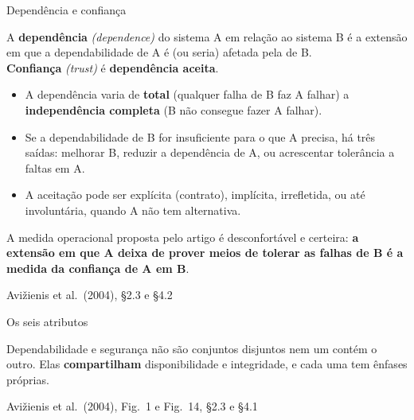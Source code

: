 \documentclass{beamer}
\newcommand{\en}[1]{{\color{depCinza}\textit{#1}}}
\newcommand{\sect}[1]{\par\smallskip\hfill{\tiny\color{black!55}Avi\v{z}ienis et al.\ (2004), #1}}
\begin{document}
\begin{frame}{Depend\^encia e confian\c{c}a}
    \footnotesize
    \begin{defi}
        \scriptsize
        A \textbf{depend\^encia} \en{(dependence)} do sistema A em rela\c{c}\~ao ao sistema B \'e a extens\~ao em que a dependabilidade de A \'e (ou seria) afetada pela de B.\\[3pt]
        \textbf{Confian\c{c}a} \en{(trust)} \'e \textbf{depend\^encia aceita}.
    \end{defi}
    \medskip
    \begin{itemize}
        \item A depend\^encia varia de \textbf{total} (qualquer falha de B faz A falhar) a \textbf{independ\^encia completa} (B n\~ao consegue fazer A falhar).
        \item Se a dependabilidade de B for insuficiente para o que A precisa, h\'a tr\^es sa\'idas: melhorar B, reduzir a depend\^encia de A, ou acrescentar toler\^ancia a faltas em A.
        \item A aceita\c{c}\~ao pode ser expl\'icita (contrato), impl\'icita, irrefletida, ou at\'e involunt\'aria, quando A n\~ao tem alternativa.
    \end{itemize}
    \medskip
    \begin{ancora}
        \footnotesize
        A medida operacional proposta pelo artigo \'e desconfort\'avel e certeira: \textbf{a extens\~ao em que A deixa de prover meios de tolerar as falhas de B \'e a medida da confian\c{c}a de A em B}.
    \end{ancora}
    \sect{\S2.3 e \S4.2}
\end{frame}

\begin{frame}{Os seis atributos}
    \centering
    \diagAtributos
    \vspace{0.3em}
    \begin{ancora}
        \scriptsize
        Dependabilidade e seguran\c{c}a n\~ao s\~ao conjuntos disjuntos nem um cont\'em o outro. Elas \textbf{compartilham} disponibilidade e integridade, e cada uma tem \^enfases pr\'oprias.
    \end{ancora}
    \sect{Fig.\ 1 e Fig.\ 14, \S2.3 e \S4.1}
\end{frame}
\end{document}
